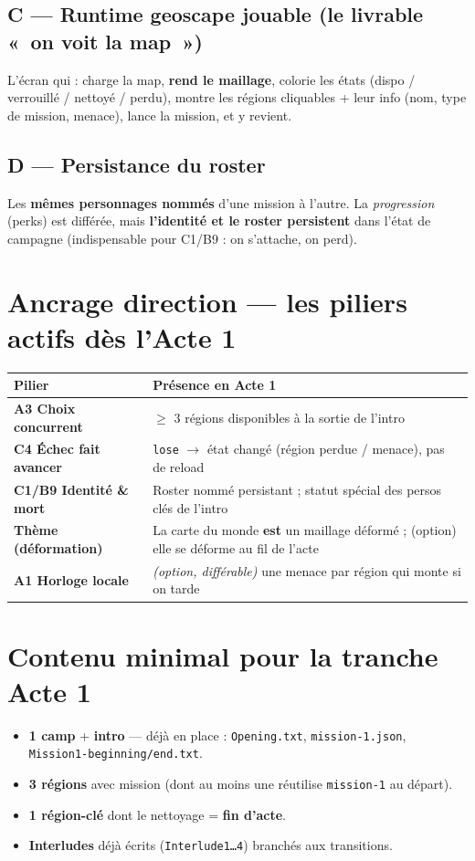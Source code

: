 \documentclass[11pt,a4paper]{article}
\begin{document}
\subsection{C --- Runtime geoscape jouable \textnormal{\small(le livrable «~on voit la map~»)}}
L'écran qui : charge la map, \textbf{rend le maillage}, colorie les états (dispo / verrouillé / nettoyé / perdu), montre les régions cliquables + leur info (nom, type de mission, menace), lance la mission, et y revient.

\subsection{D --- Persistance du roster}
Les \textbf{mêmes personnages nommés} d'une mission à l'autre. La \emph{progression} (perks) est différée, mais \textbf{l'identité et le roster persistent} dans l'état de campagne (indispensable pour C1/B9 : on s'attache, on perd).

\section{Ancrage direction --- les piliers actifs dès l'Acte 1}
\renewcommand{\arraystretch}{1.3}
\begin{tabularx}{\linewidth}{@{}>{\bfseries}p{4.2cm} X@{}}
\toprule
\textmd{\textbf{Pilier}} & \textbf{Présence en Acte 1} \\
\midrule
A3 Choix concurrent & $\geq$ 3 régions disponibles à la sortie de l'intro \\
C4 Échec fait avancer & \texttt{lose} $\to$ état changé (région perdue / menace), pas de reload \\
C1/B9 Identité \& mort & Roster nommé persistant ; statut spécial des persos clés de l'intro \\
Thème (déformation) & La carte du monde \textbf{est} un maillage déformé ; (option) elle se déforme au fil de l'acte \\
A1 Horloge locale & \emph{(option, différable)} une menace par région qui monte si on tarde \\
\bottomrule
\end{tabularx}
\renewcommand{\arraystretch}{1}

\section{Contenu minimal pour la tranche Acte 1}
\begin{itemize}
\item \textbf{1 camp} + \textbf{intro} --- déjà en place : \texttt{Opening.txt}, \texttt{mission-1.json}, \texttt{Mission1-beginning/end.txt}.
\item \textbf{3 régions} avec mission (dont au moins une réutilise \texttt{mission-1} au départ).
\item \textbf{1 région-clé} dont le nettoyage = \textbf{fin d'acte}.
\item \textbf{Interludes} déjà écrits (\texttt{Interlude1\dots4}) branchés aux transitions.
\end{itemize}
\end{document}
